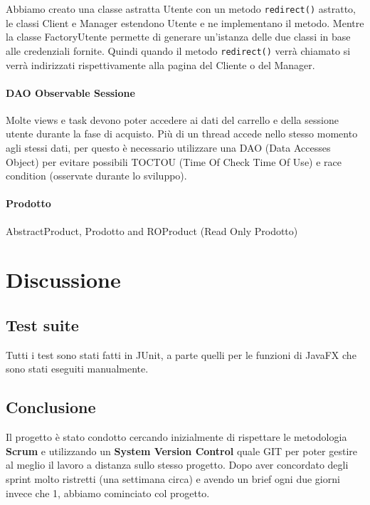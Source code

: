 \documentclass[12pt, a4paper]{report}
\begin{document}
Abbiamo creato una classe astratta Utente con un metodo \verb|redirect()|
astratto, le classi Client e Manager estendono Utente e ne implementano il
metodo. Mentre la classe FactoryUtente permette di generare un'istanza delle
due classi in base alle credenziali fornite. Quindi quando il metodo
\verb|redirect()| verrà chiamato si verrà indirizzati rispettivamente alla
pagina del Cliente o del Manager.

\subsubsection{DAO Observable Sessione}

Molte views e task devono poter accedere ai dati del carrello e della sessione
utente durante la fase di acquisto. Più di un thread accede nello stesso
momento agli stessi dati, per questo è necessario utilizzare una DAO (Data
Accesses Object) per evitare possibili TOCTOU (Time Of Check Time Of Use) e
race condition (osservate durante lo sviluppo).

\subsubsection{Prodotto}

AbstractProduct, Prodotto and ROProduct (Read Only Prodotto)


\chapter{Discussione}

\section{Test suite}

Tutti i test sono stati fatti in JUnit, a parte quelli per le funzioni di
JavaFX che sono stati eseguiti manualmente.


\section{Conclusione}

Il progetto è stato condotto cercando inizialmente di rispettare le metodologia
\textbf{Scrum} e utilizzando un \textbf{System Version Control} quale GIT per
poter gestire al meglio il lavoro a distanza sullo stesso progetto. Dopo aver
concordato degli sprint molto ristretti (una settimana circa) e avendo un brief
ogni due giorni invece che 1, abbiamo cominciato col progetto.
\end{document}
